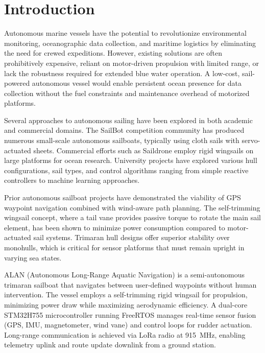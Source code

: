 
\section{Introduction}
\label{sec:introduction}

Autonomous marine vessels have the potential to revolutionize environmental monitoring, oceanographic data collection, and maritime logistics by eliminating the need for crewed expeditions. However, existing solutions are often prohibitively expensive, reliant on motor-driven propulsion with limited range, or lack the robustness required for extended blue water operation. A low-cost, sail-powered autonomous vessel would enable persistent ocean presence for data collection without the fuel constraints and maintenance overhead of motorized platforms.

Several approaches to autonomous sailing have been explored in both academic and commercial domains. The SailBot competition community has produced numerous small-scale autonomous sailboats, typically using cloth sails with servo-actuated sheets. Commercial efforts such as Saildrone employ rigid wingsails on large platforms for ocean research. University projects have explored various hull configurations, sail types, and control algorithms ranging from simple reactive controllers to machine learning approaches.

Prior autonomous sailboat projects have demonstrated the viability of GPS waypoint navigation combined with wind-aware path planning. The self-trimming wingsail concept, where a tail vane provides passive torque to rotate the main sail element, has been shown to minimize power consumption compared to motor-actuated sail systems. Trimaran hull designs offer superior stability over monohulls, which is critical for sensor platforms that must remain upright in varying sea states.

ALAN (Autonomous Long-Range Aquatic Navigation) is a semi-autonomous trimaran sailboat that navigates between user-defined waypoints without human intervention. The vessel employs a self-trimming rigid wingsail for propulsion, minimizing power draw while maximizing aerodynamic efficiency. A dual-core STM32H755 microcontroller running FreeRTOS manages real-time sensor fusion (GPS, IMU, magnetometer, wind vane) and control loops for rudder actuation. Long-range communication is achieved via LoRa radio at 915~MHz, enabling telemetry uplink and route update downlink from a ground station.

